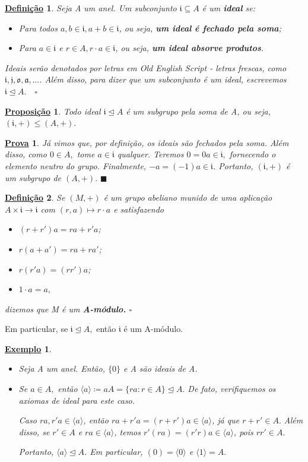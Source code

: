 \documentclass{article}
\newtheorem*{def*}{\underline{Defini\c c\~ao}}
\newtheorem*{prop*}{\underline{Proposi\c c\~ao}}
\newtheorem{example}{\underline{Exemplo}}
\newtheorem*{proof*}{\underline{Prova}}
\renewcommand\qedsymbol{$\blacksquare$}
\begin{document}
\begin{def*}
  Seja A um anel. Um subconjunto \(\mathfrak{i}\subseteq{A}\) é um \textbf{ideal} se:
 \begin{itemize}
  \item[1)] Para todos \(a, b\in \mathfrak{i}, a + b\in \mathfrak{i}\), ou seja, \textbf{um ideal é fechado pela soma};
  \item[2)] Para \(a\in \mathfrak{i}\) e \(r\in A, r \cdot a\in \mathfrak{i}\), ou seja, \textbf{um ideal absorve produtos}.
 \end{itemize}
Ideais serão denotados por letras em \textit{Old English Script} - letras frescas, como \(\mathfrak{i}, \mathfrak{j}, \mathfrak{o}, \mathfrak{a}, \dotsc\).
Além disso, para dizer que um subconjunto é um ideal, escrevemos \(\mathfrak{i} \trianglelefteq{A}.\quad\square\)
\end{def*}
\begin{prop*}
  Todo ideal \(\mathfrak{i}\trianglelefteq{A}\) é um subgrupo pela soma de A, ou seja, \((\mathfrak{i}, +)\leq (A, +).\)
\end{prop*}
\begin{proof*}
  Já vimos que, por definição, os ideais são fechados pela soma. Além disso, como \(0\in A,\) 
tome \(a\in \mathfrak{i}\) qualquer. Teremos \(0 = 0a\in \mathfrak{i},\) fornecendo o elemento neutro do grupo.
Finalmente, \(-a = (-1)a\in \mathfrak{i}\). Portanto, \((\mathfrak{i}, +)\) é um subgrupo de \((A, +).\) \qedsymbol
\end{proof*}
\begin{def*}
  Se \((M, +)\) é um grupo abeliano munido de uma aplicação \(A\times \mathfrak{i}\longrightarrow \mathfrak{i}\) com \((r, a)\mapsto r \cdot a\)
e satisfazendo
\begin{itemize}
  \item \((r + r')a = ra + r'a\);
  \item \(r(a + a') = ra + ra'\);
  \item \(r(r'a) = (rr')a\);
  \item \(1 \cdot a = a,\)
\end{itemize}
dizemos que M é um \textbf{A-módulo.} \(\square\)
\end{def*}
  Em particular, se \(\mathfrak{i} \trianglelefteq{A},\) então \(\mathfrak{i}\) é um A-módulo.
\begin{example}
  \begin{itemize}
    \item[i)] Seja A um anel. Então, \(\{0\}\) e A são ideais de A. 
    \item[ii)] Se \(a\in A,\) então \(\langle a \rangle\coloneqq aA = \{ra: r\in A\}\trianglelefteq{A}.\) De fato,
verifiquemos os axiomas de ideal para este caso.

  Caso \(ra, r'a\in \langle a \rangle\), então \(ra + r'a = (r+r')a\in \langle a \rangle\), já que \(r + r'\in A.\)
Além disso, se \(r'\in A\) e \(ra\in \langle a \rangle\), temos \(r'(ra) = (r'r)a\in \langle a \rangle\), pois \(rr'\in A.\)

  Portanto, \(\langle a \rangle \trianglelefteq{A}\). Em particular, \((0) = \langle 0 \rangle\) e \(\langle 1 \rangle = A.\)
  \end{itemize}
\end{example}
\end{document}
